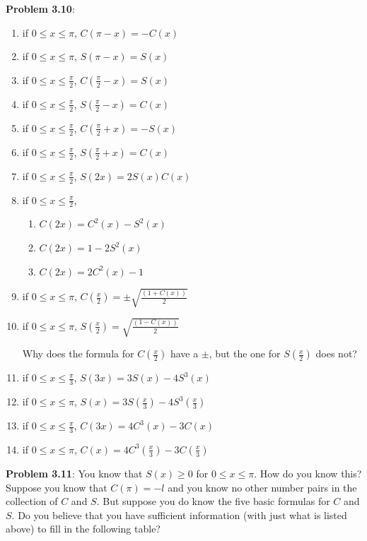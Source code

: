 \documentclass[english]{book}
\begin{document}
\vspace{0.3cm}

\textbf{Problem 3.10}:
\begin{enumerate}[\hspace{1cm}a)]
  \item if $0 \leq x \leq \pi$, $C(\pi-x) = -C(x)$
  \item if $0 \leq x \leq \pi$, $S(\pi-x) = S(x)$
  \item if $0 \leq x \leq \frac{\pi}{2}$, $C(\frac{\pi}{2}-x) = S(x)$
  \item if $0 \leq x \leq \frac{\pi}{2}$, $S(\frac{\pi}{2}-x) = C(x)$
  \item if $0 \leq x \leq \frac{\pi}{2}$, $C(\frac{\pi}{2}+x) = -S(x)$
  \item if $0 \leq x \leq \frac{\pi}{2}$, $S(\frac{\pi}{2}+x) = C(x)$
  \item if $0 \leq x \leq \frac{\pi}{2}$, $S(2x) = 2 S(x) C(x)$
  \item if $0 \leq x \leq \frac{\pi}{2}$, 
        \begin{enumerate}[\hspace{1cm}i)]
          \item $C(2x) = C^{2}(x) - S^{2}(x)$
          \item $C(2x) = 1 - 2S^{2}(x)$
          \item $C(2x) = 2C^{2}(x) - 1$
        \end{enumerate}
  \item if $0 \leq x \leq \pi$, $C(\frac{x}{2}) = \pm \sqrt{\frac{(1+C(x))}{2}}$
  \item if $0 \leq x \leq \pi$, $S(\frac{x}{2}) = \sqrt{\frac{(1-C(x))}{2}}$

        Why does the formula for $C(\frac{x}{2})$ have a $\pm$, but the one for $S(\frac{x}{2})$ does not?
  \item if $0 \leq x \leq \frac{\pi}{3}$, $S(3x) = 3S(x) -4S^{3}(x)$
  \item if $0 \leq x \leq \pi$, $S(x) = 3S(\frac{x}{3})- 4S^{3}(\frac{x}{3})$
  \item if $0 \leq x \leq \frac{\pi}{3}$, $C(3x) = 4C^{3}(x) - 3C(x)$
  \item if $0 \leq x \leq \pi$, $C(x) = 4C^{3}(\frac{x}{3}) - 3C(\frac{x}{3})$
\end{enumerate}

\textbf{Problem 3.11}: You know that $S(x) \geq 0$ for $0 \leq x \leq \pi$. How do you know this? Suppose you know that $C(\pi) = -l$ and you know no other number pairs in the collection of $C$ and $S$. But suppose you do know the five basic formulas for $C$ and $S$. Do you believe that you have sufficient information (with just what is listed above) to fill in the following table?
\end{document}
